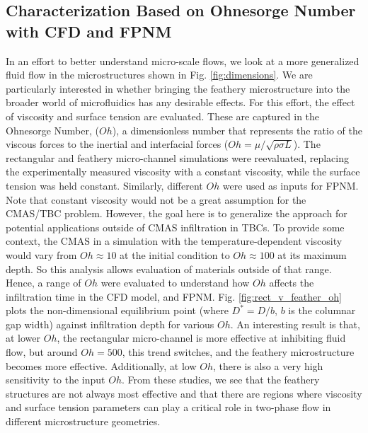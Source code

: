 \documentclass[%
 aip,
 amsmath,amssymb,
 reprint,%
]{revtex4-1}
\begin{document}
\subsection{Characterization Based on Ohnesorge Number with CFD and FPNM}

In an effort to better understand micro-scale flows, we look at a more generalized fluid flow in the microstructures shown in Fig. \ref{fig:dimensions}. We are particularly interested in whether bringing the feathery microstructure into the broader world of microfluidics has any desirable effects. For this effort, the effect of viscosity and surface tension are evaluated. These are captured in the Ohnesorge Number, ($Oh$), a dimensionless number that represents the ratio of the viscous forces to the inertial and interfacial forces ($Oh = \mu / \sqrt{\rho \sigma L}$). 
The rectangular and feathery micro-channel simulations were reevaluated, replacing the experimentally measured viscosity with a constant viscosity, while the surface tension was held constant.
Similarly, different $Oh$ were used as inputs for FPNM.
Note that constant viscosity would not be a great assumption for the CMAS/TBC problem. However, the goal here is to generalize the approach for potential applications outside of CMAS infiltration in TBCs.
To provide some context, the CMAS in a simulation with the temperature-dependent viscosity would vary from 
$Oh\approx 10$ at the initial condition to $Oh \approx 100$ at its maximum depth. So this analysis allows evaluation of materials outside of that range.
Hence, a range of $Oh$ were evaluated to understand how $Oh$ affects the infiltration time in the CFD model, and FPNM. 
Fig. \ref{fig:rect_v_feather_oh} plots the non-dimensional equilibrium point (where $D^{*} = D/b$, $b$ is the columnar gap width) against infiltration depth for various $Oh$. 
An interesting result is that, at lower $Oh$, the rectangular micro-channel is more effective at inhibiting fluid flow, but around $Oh=500$, this trend switches, and the feathery microstructure becomes more effective. Additionally, at low $Oh$, there is also a very high sensitivity to the input $Oh$.  
From these studies, we see that the feathery structures are not always most effective and that there are regions where viscosity and surface tension parameters can play a critical role in two-phase flow in different microstructure geometries. 
\end{document}

